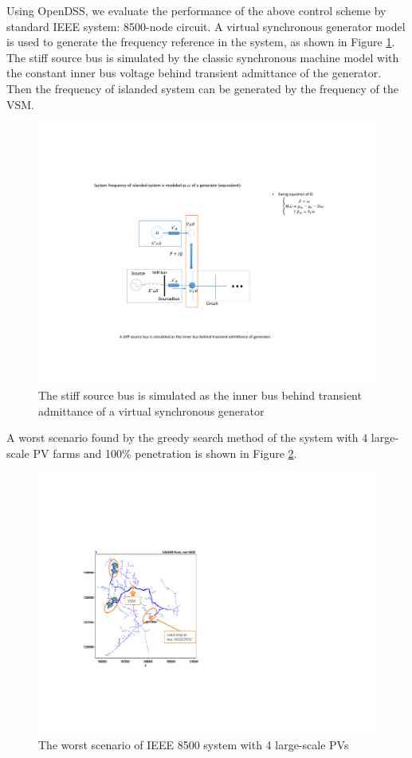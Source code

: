 \documentclass{article}
\begin{document}
Using OpenDSS, we evaluate the performance of the above control scheme by standard IEEE system: 8500-node circuit. A virtual synchronous generator model is used to generate the frequency reference in the system, as shown in Figure \ref{fig:vsm}. The stiff source bus is simulated by the classic synchronous machine model with the constant inner bus voltage behind transient admittance of the generator. Then the frequency of islanded system can be generated by the frequency of the VSM.
\begin{figure}[ht]
    \centering
    \includegraphics[width=0.9\linewidth]{pics/vsm.pdf}
    \caption{The stiff source bus is simulated as the inner bus behind transient admittance of a virtual synchronous generator}
    \label{fig:vsm}
\end{figure}
A worst scenario found by the greedy search method \cite{rathbun2018impact} of the system with 4 large-scale PV farms and 100\% penetration is shown in Figure \ref{fig:f8500}. 
\begin{figure}[h!]
    \centering
    \includegraphics[width=\linewidth]{pics/f8500.pdf}
    \caption{The worst scenario of IEEE 8500 system with 4 large-scale PVs}
    \label{fig:f8500}
\end{figure}
\end{document}
